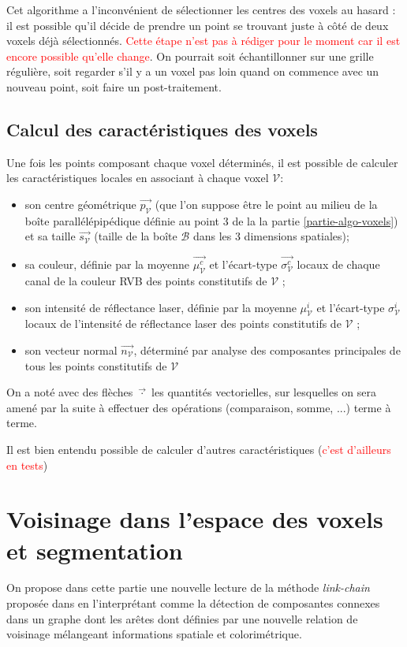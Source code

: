 \documentclass[a4paper, onecolumn, 11pt]{article}
\newcommand{\TODO}{\fbox{\textcolor{red}{TODO}}}
\newcommand{\V}{\mathcal{V}}
\begin{document}
Cet algorithme a l'inconvénient de sélectionner les centres des voxels au hasard : il est possible qu'il décide de prendre un point se trouvant juste à côté de deux voxels déjà sélectionnés. \textcolor{red}{Cette étape n'est pas à rédiger pour le moment car il est encore possible qu'elle change}. \TODO
On pourrait soit échantillonner sur une grille régulière, soit regarder s'il y a un voxel pas loin quand on commence avec un nouveau point, soit faire un post-traitement.

\subsection{Calcul des caractéristiques des voxels}
Une fois les points composant chaque voxel déterminés, il est possible de calculer les caractéristiques locales en associant à chaque voxel $\V$:

\begin{itemize}
\item son centre géométrique $\overrightarrow{p_\V}$ (que l'on suppose être le point au milieu de la boîte parallélépipédique définie au point 3 de la la partie \ref{partie-algo-voxels}) et sa taille $\overrightarrow{s_\V}$ (taille de la boîte $\mathcal{B}$ dans les 3 dimensions spatiales);
\item sa couleur, définie par la moyenne $\overrightarrow{\mu_\V^c}$ et l'écart-type $\overrightarrow{\sigma_\V^c}$ locaux de chaque canal de la couleur RVB des points constitutifs de $\mathcal{V}$ ;
\item son intensité de réflectance laser, définie par la moyenne $\mu_\V^i$ et l'écart-type $\sigma_\V^i$ locaux de l'intensité de réflectance laser des points constitutifs de $\mathcal{V}$ ;
\item son vecteur normal $\overrightarrow{n_\V}$, déterminé par analyse des composantes principales de tous les points constitutifs de $\mathcal{V}$
\end{itemize}

On a noté avec des flèches $\overrightarrow{\cdot}$ les quantités vectorielles, sur lesquelles on sera amené par la suite à effectuer des opérations (comparaison, somme, ...) terme à terme.

Il est bien entendu possible de calculer d'autres caractéristiques (\textcolor{red}{c'est d'ailleurs en tests}) \TODO

\section{Voisinage dans l'espace des voxels et segmentation}
On propose dans cette partie une nouvelle lecture de la méthode \emph{link-chain} proposée dans \cite{aka_article} en l'interprétant comme la détection de composantes connexes dans un graphe dont les arêtes dont définies par une nouvelle relation de voisinage mélangeant informations spatiale et colorimétrique.
\end{document}

